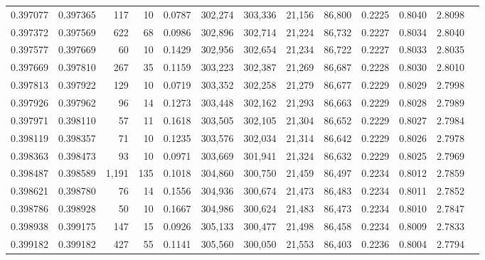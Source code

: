 \begin{tabular}{rrrrrrrrrrrrr}
0.397077 & 0.397365 &   117 &  10 &                                     0.0787 & 302,274 & 303,336 &  21,156 &  86,800 & 0.2225 & 0.8040 & 2.8098 \\
0.397372 & 0.397569 &   622 &  68 &                                     0.0986 & 302,896 & 302,714 &  21,224 &  86,732 & 0.2227 & 0.8034 & 2.8040 \\
0.397577 & 0.397669 &    60 &  10 &                                     0.1429 & 302,956 & 302,654 &  21,234 &  86,722 & 0.2227 & 0.8033 & 2.8035 \\
0.397669 & 0.397810 &   267 &  35 &                                     0.1159 & 303,223 & 302,387 &  21,269 &  86,687 & 0.2228 & 0.8030 & 2.8010 \\
0.397813 & 0.397922 &   129 &  10 &                                     0.0719 & 303,352 & 302,258 &  21,279 &  86,677 & 0.2229 & 0.8029 & 2.7998 \\
0.397926 & 0.397962 &    96 &  14 &                                     0.1273 & 303,448 & 302,162 &  21,293 &  86,663 & 0.2229 & 0.8028 & 2.7989 \\
0.397971 & 0.398110 &    57 &  11 &                                     0.1618 & 303,505 & 302,105 &  21,304 &  86,652 & 0.2229 & 0.8027 & 2.7984 \\
0.398119 & 0.398357 &    71 &  10 &                                     0.1235 & 303,576 & 302,034 &  21,314 &  86,642 & 0.2229 & 0.8026 & 2.7978 \\
0.398363 & 0.398473 &    93 &  10 &                                     0.0971 & 303,669 & 301,941 &  21,324 &  86,632 & 0.2229 & 0.8025 & 2.7969 \\
0.398487 & 0.398589 & 1,191 & 135 &                                     0.1018 & 304,860 & 300,750 &  21,459 &  86,497 & 0.2234 & 0.8012 & 2.7859 \\
0.398621 & 0.398780 &    76 &  14 &                                     0.1556 & 304,936 & 300,674 &  21,473 &  86,483 & 0.2234 & 0.8011 & 2.7852 \\
0.398786 & 0.398928 &    50 &  10 &                                     0.1667 & 304,986 & 300,624 &  21,483 &  86,473 & 0.2234 & 0.8010 & 2.7847 \\
0.398938 & 0.399175 &   147 &  15 &                                     0.0926 & 305,133 & 300,477 &  21,498 &  86,458 & 0.2234 & 0.8009 & 2.7833 \\
0.399182 & 0.399182 &   427 &  55 &                                     0.1141 & 305,560 & 300,050 &  21,553 &  86,403 & 0.2236 & 0.8004 & 2.7794 \\

\end{tabular}
